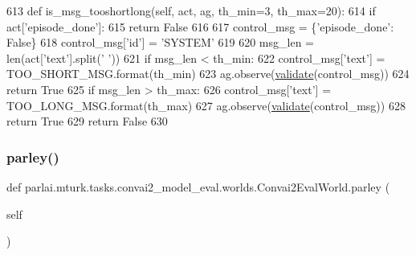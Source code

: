 \begin{DoxyCode}
613     \textcolor{keyword}{def }is\_msg\_tooshortlong(self, act, ag, th\_min=3, th\_max=20):
614         \textcolor{keywordflow}{if} act[\textcolor{stringliteral}{'episode\_done'}]:
615             \textcolor{keywordflow}{return} \textcolor{keyword}{False}
616 
617         control\_msg = \{\textcolor{stringliteral}{'episode\_done'}: \textcolor{keyword}{False}\}
618         control\_msg[\textcolor{stringliteral}{'id'}] = \textcolor{stringliteral}{'SYSTEM'}
619 
620         msg\_len = len(act[\textcolor{stringliteral}{'text'}].split(\textcolor{stringliteral}{' '}))
621         \textcolor{keywordflow}{if} msg\_len < th\_min:
622             control\_msg[\textcolor{stringliteral}{'text'}] = TOO\_SHORT\_MSG.format(th\_min)
623             ag.observe(\hyperlink{namespaceparlai_1_1core_1_1worlds_afc3fad603b7bce41dbdc9cdc04a9c794}{validate}(control\_msg))
624             \textcolor{keywordflow}{return} \textcolor{keyword}{True}
625         \textcolor{keywordflow}{if} msg\_len > th\_max:
626             control\_msg[\textcolor{stringliteral}{'text'}] = TOO\_LONG\_MSG.format(th\_max)
627             ag.observe(\hyperlink{namespaceparlai_1_1core_1_1worlds_afc3fad603b7bce41dbdc9cdc04a9c794}{validate}(control\_msg))
628             \textcolor{keywordflow}{return} \textcolor{keyword}{True}
629         \textcolor{keywordflow}{return} \textcolor{keyword}{False}
630 
\end{DoxyCode}
\mbox{\label{classparlai_1_1mturk_1_1tasks_1_1convai2__model__eval_1_1worlds_1_1Convai2EvalWorld_a88eef2bcb0b78f250ba0035df4975652}} 
\subsubsection{\texorpdfstring{parley()}{parley()}}
{\footnotesize\ttfamily def parlai.\+mturk.\+tasks.\+convai2\+\_\+model\+\_\+eval.\+worlds.\+Convai2\+Eval\+World.\+parley (\begin{DoxyParamCaption}\item[{}]{self }\end{DoxyParamCaption})}



